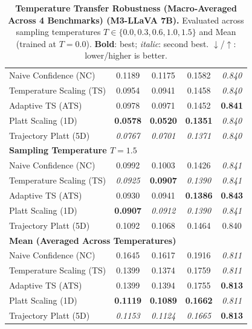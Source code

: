 \begin{table}[t]
{\begin{tabular}{lcccc}
\midrule
Naive Confidence (NC) & 0.1189 & 0.1175 & 0.1582 & \textit{0.840} \\
Temperature Scaling (TS) & 0.0954 & 0.0941 & 0.1458 & \textit{0.840} \\
Adaptive TS (ATS) & 0.0978 & 0.0971 & 0.1452 & \textbf{0.841} \\
Platt Scaling (1D) & \textbf{0.0578} & \textbf{0.0520} & \textbf{0.1351} & \textit{0.840} \\
Trajectory Platt (5D) & \textit{0.0767} & \textit{0.0701} & \textit{0.1371} & \textit{0.840} \\
\midrule
\multicolumn{5}{l}{\textbf{Sampling Temperature $T = 1.5$}} \\
\midrule
Naive Confidence (NC) & 0.0992 & 0.1003 & 0.1426 & \textit{0.841} \\
Temperature Scaling (TS) & \textit{0.0925} & \textbf{0.0907} & \textit{0.1390} & \textit{0.841} \\
Adaptive TS (ATS) & 0.0930 & 0.0941 & \textbf{0.1386} & \textbf{0.843} \\
Platt Scaling (1D) & \textbf{0.0907} & \textit{0.0912} & \textit{0.1390} & \textit{0.841} \\
Trajectory Platt (5D) & 0.1092 & 0.1068 & 0.1464 & 0.840 \\
\midrule
\multicolumn{5}{l}{\textbf{Mean (Averaged Across Temperatures)}} \\
\midrule
Naive Confidence (NC) & 0.1645 & 0.1617 & 0.1916 & \textit{0.811} \\
Temperature Scaling (TS) & 0.1399 & 0.1374 & 0.1759 & \textit{0.811} \\
Adaptive TS (ATS) & 0.1399 & 0.1394 & 0.1755 & \textbf{0.813} \\
Platt Scaling (1D) & \textbf{0.1119} & \textbf{0.1089} & \textbf{0.1662} & \textit{0.811} \\
Trajectory Platt (5D) & \textit{0.1153} & \textit{0.1124} & \textit{0.1665} & \textbf{0.813} \\
\bottomrule
\end{tabular}%
}
\caption{\textbf{Temperature Transfer Robustness (Macro-Averaged Across 4 Benchmarks) (M3-LLaVA 7B).} Evaluated across sampling temperatures $T \in \{0.0, 0.3, 0.6, 1.0, 1.5\}$ and Mean (trained at $T=0.0$). \textbf{Bold}: best; \textit{italic}: second best. $\downarrow$/$\uparrow$: lower/higher is better.}
\label{tab:temp_transfer_m3_macro}
\end{table}


